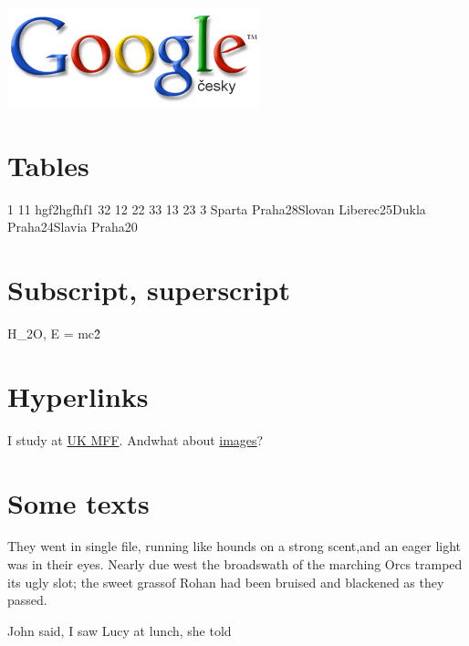 \documentclass{article}
\begin{document}
\par


\par
\includegraphics{logo.png}

\section{Tables}
1 11 hgf2hgfhf1 32 12 22 33 13 23 3
\newline
Sparta Praha28Slovan Liberec25Dukla Praha24Slavia Praha20
\section{Subscript, superscript}

\par
H\_{2}O, E = mc\^{2}

\section{Hyperlinks}

\par
I study at \href{http://www.mff.cuni.cz/}{UK MFF}. Andwhat about \href{#img}{images}?

\section{Some texts}

\par


\begin{center}They went in single file, running like hounds on a strong scent,and an eager light was in their eyes. Nearly due west the broadswath of the marching
{\fontsize{4}{5}\selectfont Orcs tramped}
its ugly slot; the sweet grassof Rohan had been bruised and blackened as they passed.\end{center}

\par


\par
John said, I saw Lucy at lunch, she told
\end{document}
